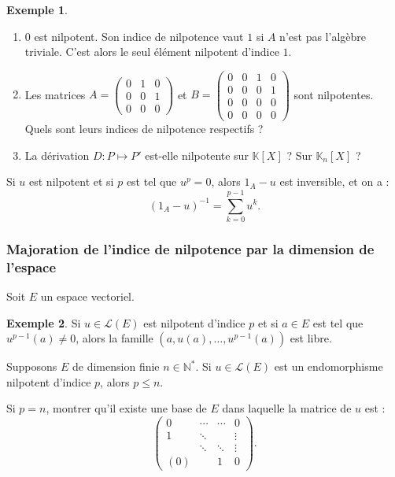 \documentclass[french]{article}
\newcommand{\N}{\mathbb{N}}
\newcommand{\K}{\mathbb{K}}
\newcommand{\st}{^*}
\newcommand{\inv}{^{-1}}
\theoremstyle{plain}
\theoremstyle{definition}
\newtheorem*{ex}{Exemple}
\theoremstyle{remark}
\begin{document}
\begin{ex}
	\begin{enumerate}
		\item $0$ est nilpotent. Son indice de nilpotence vaut $1$ si $A$ n'est pas l'algèbre triviale. C'est alors le seul élément nilpotent d'indice $1$.
		\item Les matrices $A=\displaystyle\begin{pmatrix}
			0&1&0\\
			0&0&1\\
			0&0&0
		\end{pmatrix}$ et $B=\displaystyle\begin{pmatrix}
		0&0&1&0\\
		0&0&0&1\\
		0&0&0&0\\
		0&0&0&0
		\end{pmatrix}$ sont nilpotentes. Quels sont leurs indices de nilpotence respectifs ?
		\item La dérivation $D:P\mapsto P'$ est-elle nilpotente sur $\K[X]$ ? Sur $\K_n[X]$ ?
	\end{enumerate}
\end{ex}

\begin{prop}[HP]%
	Si $u$ est nilpotent et si $p$ est tel que $u^p=0$, alors $1_A-u$ est inversible, et on a : $$(1_A-u)\inv=\sum_{k=0}^{p-1}u^k.$$
\end{prop}

\subsubsection*{Majoration de l'indice de nilpotence par la dimension de l'espace}

Soit $E$ un espace vectoriel.

\begin{ex}
	Si $u\in\mathcal{L}(E)$ est nilpotent d'indice $p$ et si $a\in E$ est tel que $u^{p-1}(a)\ne 0$, alors la famille $(a,u(a),\ldots,u^{p-1}(a))$ est libre.
\end{ex}

\begin{prop}%
	Supposons $E$ de dimension finie $n\in\N\st$. Si $u\in\mathcal{L}(E)$ est un endomorphisme nilpotent d'indice $p$, alors $p\leqslant n$.
\end{prop}

\begin{exo}
	Si $p=n$, montrer qu'il existe une base de $E$ dans laquelle la matrice de $u$ est : $$\begin{pmatrix}
		0&\cdots&\cdots&0\\
		1&\ddots&&\vdots\\
		&\ddots&\ddots&\vdots\\
		(0)&&1&0
	\end{pmatrix}.$$
\end{exo}
\end{document}
